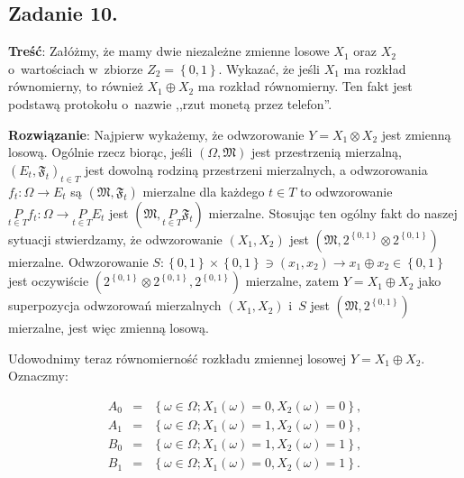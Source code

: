 \documentclass[a4paper,10pt, twocolumn]{article}
\begin{document}
\subsection{Zadanie 10.}
\label{subsec:KolZadanie10}

\textbf{Treść}: Załóżmy, że mamy dwie niezależne zmienne losowe $X_{1}$ oraz $X_{2}$ o~wartościach w~zbiorze $Z_{2} = \left\{0, 1\right\}$. Wykazać, że jeśli $X_{1}$ ma rozkład równomierny, to również $X_{1} \oplus X_{2}$ ma rozkład równomierny. Ten fakt jest podstawą protokołu o~nazwie ,,rzut monetą przez telefon''.

\textbf{Rozwiązanie}: Najpierw wykażemy, że odwzorowanie $Y = X_{1} \otimes X_{2}$ jest zmienną losową. Ogólnie rzecz biorąc, jeśli $(\Omega, \mathfrak{M})$ jest przestrzenią mierzalną, $(E_{t}, \mathfrak{F}_{t})_{t \in T}$ jest dowolną rodziną przestrzeni mierzalnych, a odwzorowania $f_{t}: \Omega \rightarrow E_{t}$ są $(\mathfrak{M}, \mathfrak{F}_{t})$ mierzalne dla każdego $t \in T$ to odwzorowanie $\underset{t \in T}{P} f_{t}: \Omega \rightarrow \underset{t \in T}{P} E_{t}$ jest $(\mathfrak{M}, \underset{t \in T}{P} \mathfrak{F}_{t})$ mierzalne. Stosując ten ogólny fakt do naszej sytuacji stwierdzamy, że odwzorowanie $(X_{1}, X_{2})$ jest $(\mathfrak{M}, 2^{\left\{0,1\right\}} \otimes  2^{\left\{0,1\right\}})$ mierzalne. Odwzorowanie $S: \left\{0,1\right\} \times \left\{0,1\right\} \ni (x_{1}, x_{2}) \rightarrow x_{1} \oplus x_{2} \in \left\{0,1\right\}$ jest oczywiście $(2^{\left\{0,1\right\}} \otimes  2^{\left\{0,1\right\}},  2^{\left\{0,1\right\}})$ mierzalne, zatem $Y = X_{1} \oplus X_{2}$ jako superpozycja odwzorowań mierzalnych $(X_{1}, X_{2})$ i~$S$ jest $(\mathfrak{M},  2^{\left\{0,1\right\}})$ mierzalne, jest więc zmienną losową.

Udowodnimy teraz równomierność rozkładu zmiennej losowej $Y = X_{1} \oplus X_{2}$. Oznaczmy: 

\begin{equation*}
 \begin{array}{lcl} A_{0} & = & \left\{\omega \in \Omega; X_{1}(\omega) = 0, X_{2}(\omega) = 0 \right\}, \\ A_{1} & = & \left\{\omega \in \Omega; X_{1}(\omega) = 1, X_{2}(\omega) = 0 \right\}, \\ B_{0} & = & \left\{\omega \in \Omega; X_{1}(\omega) = 1, X_{2}(\omega) = 1 \right\}, \\ B_{1} & = & \left\{\omega \in \Omega; X_{1}(\omega) = 0, X_{2}(\omega) = 1 \right\}. \\\end{array}
\end{equation*}
\end{document}
